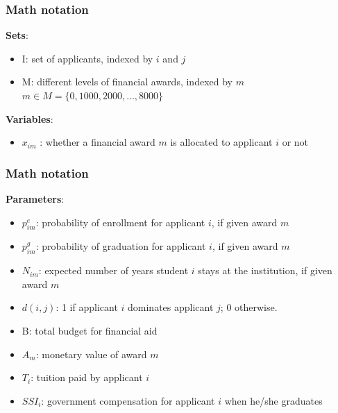 \documentclass{beamer}
\begin{document}
\begin{frame}
\frametitle{Math notation}
\textbf{Sets}:
\begin{itemize}
\item I:   set of applicants,  indexed by $i$ and $j$ \\
\item  M:  different levels of financial awards, indexed by 
$m$\\
$m \in  M = \{ 0,1000, 2000, \ldots ,8000\} $ \end{itemize}


\textbf{Variables}:
\begin{itemize}
\item $x_{im}$ :
whether a financial award $m$ 
is allocated to applicant $i$ or not
\end{itemize}

\end{frame}

\begin{frame}
\frametitle{Math notation}

\textbf{Parameters}:
\begin{itemize}
\item $p^e_{im}$: \hspace{0.3cm}  probability of enrollment for applicant 
$i$, if given award $m$
\item $p^g_{im}$: \hspace{0.3cm}  probability of graduation for applicant 
$i$, if given award $m$ 
\item $N_{im}$: \hspace{0.3cm}   expected number of years student $i$ 
stays at the institution, if given award $m$
\item $d(i,j)$: \hspace{0.3cm}    1 if applicant $i$ dominates 
applicant $j$; 0 otherwise.
\item B:      \hspace{0.3cm} total budget for financial aid
\item $A_m$:   \hspace{0.1cm} monetary value of award $m$
\item $T_i$:   \hspace{0.2cm} tuition paid by applicant $i$
\item $SSI_i$: \hspace{0cm} government compensation for
				applicant $i$ when he/she graduates

\end{itemize}
\end{frame}
\end{document}
